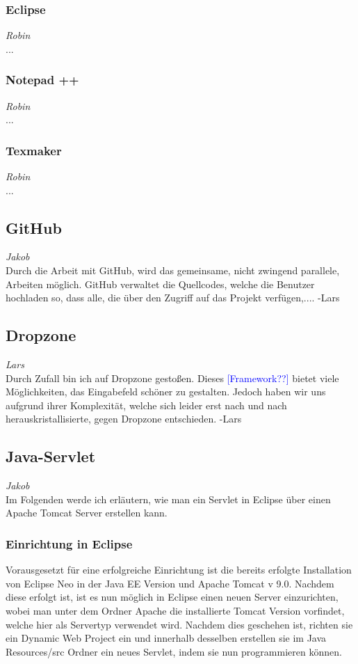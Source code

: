 \documentclass[12pt,a4paper,bibliography=totocnumbered,listof=totocnumbered]{scrartcl}
\begin{document}
\subsubsection{Eclipse}
\label{sec:Eclipse}
\emph{Robin}\\
...

\subsubsection{Notepad ++}
\label{sec:Notepad++}
\emph{Robin}\\
...

\subsubsection{Texmaker}
\label{sec:Texmaker}
\emph{Robin}\\
...

\subsection{GitHub}
\emph{Jakob}\\
Durch die Arbeit mit GitHub, wird das gemeinsame, nicht zwingend parallele, Arbeiten möglich.
GitHub verwaltet die Quellcodes, welche die Benutzer hochladen so, dass
alle, die über den Zugriff auf das Projekt verfügen,.... -Lars

\subsection{Dropzone}
\emph{Lars}\\
Durch Zufall bin ich auf Dropzone gestoßen.
Dieses \textcolor{blue}{[Framework??]} bietet viele Möglichkeiten, 
das Eingabefeld schöner zu gestalten.
Jedoch haben wir uns aufgrund ihrer Komplexität, welche sich leider erst
nach und nach herauskristallisierte, gegen Dropzone entschieden. -Lars

\subsection{Java-Servlet}
\emph{Jakob}\\
Im Folgenden werde ich erläutern, wie man ein Servlet in Eclipse über einen Apache Tomcat Server erstellen kann.

\subsubsection{Einrichtung in Eclipse}
Vorausgesetzt für eine erfolgreiche Einrichtung ist die bereits erfolgte Installation von Eclipse Neo in der Java EE Version und Apache Tomcat v 9.0. 
Nachdem  diese erfolgt ist, ist es nun möglich in Eclipse einen neuen Server einzurichten, wobei man unter dem Ordner Apache die installierte Tomcat Version vorfindet, welche hier  als Servertyp verwendet wird.
Nachdem dies geschehen ist, richten sie ein Dynamic Web Project ein und innerhalb desselben erstellen sie im Java Resources/src  Ordner ein neues Servlet, indem sie nun programmieren können.
\end{document}
